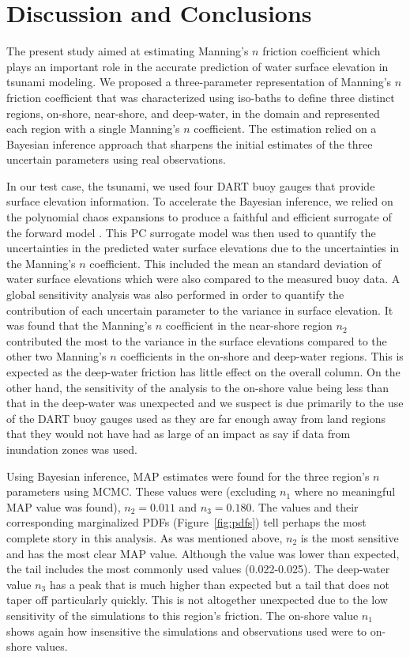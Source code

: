 \section{Discussion and Conclusions}
\label{sec:conc}

The present study aimed at estimating Manning's $n$ friction coefficient  which
plays an important role in the accurate prediction of water surface elevation in
tsunami modeling. We proposed a three-parameter representation of Manning's $n$
friction coefficient that was characterized using iso-baths  to define three
distinct regions, on-shore, near-shore, and deep-water, in the domain and
represented each region with a single Manning's $n$ coefficient.  The estimation
relied on a Bayesian inference approach that sharpens the initial estimates of
the three uncertain parameters using real observations.

In our test case, the \tohoku tsunami, we used four DART buoy gauges that
provide  surface elevation information.  To accelerate the Bayesian inference,
we relied on the polynomial  chaos expansions to produce a faithful and
efficient surrogate of the forward model \geoclaw.  This PC surrogate model was
then used to quantify the uncertainties in the predicted water surface
elevations due to the uncertainties in the Manning's $n$ coefficient.  This
included the mean an standard deviation of water surface elevations which were
also compared to the measured buoy data.  A global sensitivity analysis was also
performed in order to quantify the contribution of each uncertain parameter to
the variance in surface elevation.  It was found that the Manning's $n$
coefficient in the near-shore region $n_2$ contributed the most to the variance
in the surface elevations compared to the other two Manning's $n$ coefficients
in the on-shore and deep-water regions.  This is expected as the deep-water
friction has little effect on the overall column.  On the other hand, the
sensitivity of the analysis to the on-shore value being less than that in the
deep-water was unexpected and we suspect is due primarily to the use of the
DART buoy gauges used as they are far enough away from land regions that they
would not have had as large of an impact as say if data from inundation zones
was used.

Using Bayesian inference, MAP estimates were found for the three region's $n$
parameters using MCMC.  These values were (excluding $n_1$ where no meaningful
MAP value was found), $n_2=0.011$ and $n_3=0.180$.  The values and their
corresponding marginalized PDFs (Figure~\ref{fig:pdfs}) tell perhaps the most
complete story in this analysis.  As was mentioned above, $n_2$ is the most
sensitive and has the most clear MAP value.  Although the value was lower than
expected, the tail includes the most commonly used values (0.022-0.025).  The
deep-water value $n_3$ has a peak that is much higher than expected but a tail
that does not taper off particularly quickly.  This is not altogether unexpected
due to the low sensitivity of the simulations to this region's friction.  The
on-shore value $n_1$ shows again how insensitive the simulations and
observations used were to on-shore values.

